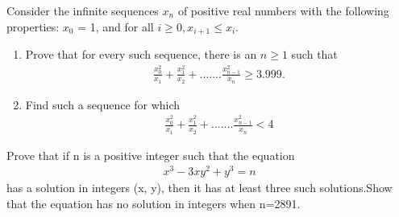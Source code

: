 \item Consider the infinite sequences $x_n$ of positive real numbers with the following properties: 
$x_0$ = 1, and for all $i \geq 0, x_{i+1} \leq x_i.$
\begin{enumerate}
\item Prove that for every such sequence, there is an $n \geq 1$ such that
\begin{align*}
\frac{x_0^2}{x_1} + \frac{x_1^2}{x_2} + .......\frac{x_{n - 1}^2}{x_n} \geq 3.999.
\end{align*}
\item Find such a sequence for which
\begin{align*}
\frac{x_0^2}{x_1} + \frac{x_1^2}{x_2} + .......\frac{x_{n - 1}^2}{x_n} < 4
\end{align*}
\end{enumerate} 

\item Prove that if n is a positive integer such that the equation
\begin{align}
x^3 - 3xy^2 + y^3 = n
\end{align}
has a solution in integers (x, y), then it has at least three such solutions.Show that the equation has no solution in integers when n=2891.


